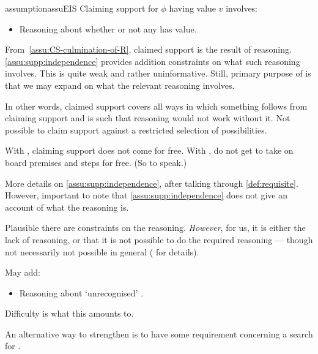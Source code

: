 \begin{note}
  \begin{restatable}[\eiS{-} --- \eiS{}]{assumption}{assuEIS}\label{assu:supp:independence}
    Claiming support for \(\phi\) having value \(v\) involves:
    \begin{itemize}
    \item Reasoning about whether or not any \requ{} has value.
    \end{itemize}
    \vspace{-\baselineskip}
  \end{restatable}

  From~\autoref{assu:CS-culmination-of-R}, claimed support is the result of reasoning.
  \autoref{assu:supp:independence} provides addition constraints on what such reasoning involves.
  This is quite weak and rather uninformative.
  Still, primary purpose of \eiS{} is that we may expand on what the relevant reasoning involves.

  {\color{blue}
    In other words, claimed support covers all ways in which something follows from claiming support and is such that reasoning would not work without it.
    Not possible to claim support against a restricted selection of possibilities.
  }

  {\color{red}
    With \misled{}, claiming support does not come for free.
    With \mistaken{}, do not get to take on board premises and steps for free.
    (So to speak.)
  }

  More details on \autoref{assu:supp:independence}, after talking through \autoref{def:requisite}.
  However, important to note that \autoref{assu:supp:independence} does not give an account of what the reasoning is.

  Plausible there are constraints on the reasoning.
  \emph{However}, for us, it is either the lack of reasoning, or that it is not possible to do the required reasoning --- though not necessarily not possible in general (\nI{} for details).
\end{note}

\begin{note}
  May add:
  \begin{itemize}
  \item Reasoning about `unrecognised' .
  \end{itemize}
  Difficulty is what this amounts to.

  An alternative way to strengthen is to have some requirement concerning a search for .
\end{note}

